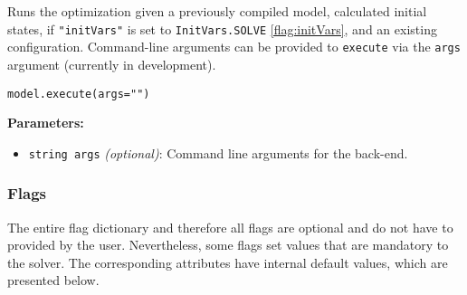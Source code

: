 \documentclass[12pt]{article}
\begin{document}
\begin{mdframed}[backgroundcolor=gray!10, roundcorner=10pt,
		linewidth=1pt]

	Runs the optimization given a previously compiled model, calculated initial states, if \texttt{"initVars"} is set to \texttt{InitVars.SOLVE} \eqref{flag:initVars}, and an existing configuration.
	Command-line arguments can be provided to \texttt{execute} via the \texttt{args} argument (currently in development).

	\begin{lstlisting}
model.execute(args="")
	\end{lstlisting}
	\label{execute}
	\textbf{Parameters:}
	\begin{itemize}
		\item \texttt{string args} \emph{(optional)}: Command line arguments for the back-end.
	\end{itemize}

\end{mdframed}


\subsubsection{Flags}
\label{c:flags}

The entire flag dictionary and therefore all flags are optional and do not have
to provided by the user. Nevertheless, some flags set values that are mandatory
to the solver. The corresponding attributes have internal default values, which
are presented below.
\end{document}
